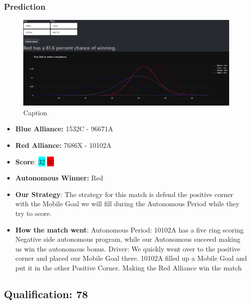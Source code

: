 \subsubsection*{Prediction}
\begin{figure}[H]
    \centering
    \includegraphics[width=0.8\linewidth]{images/Q68ND.png}
    \caption{Caption}
    \label{fig:enter-label}
\end{figure}
\begin{itemize}
    \item \textbf{Blue Alliance:} 1532C - 96671A
    \item \textbf{Red Alliance:} 7686X - 10102A
    \item \textbf{Score}: \colorbox{cyan}{32}
    \colorbox{red}{30}
    \item \textbf{Autonomous Winner:} Red
    \item \textbf{Our Strategy}: The strategy for this match is defend the positive corner with the Mobile Goal we will fill during the Autonomous Period while they try to score.
    \item \textbf{How the match went}: Autonomous Period: 10102A has a five ring scoring Negative side autonomous program, while our Autonomous succeed making us win the autonomous bonus. Driver: We quickly went over to the positive corner and placed our Mobile Goal there. 10102A filled up a Mobile Goal and put it in the other Positive Corner. Making the Red Alliance win the match
\end{itemize}

\subsection*{Qualification: 78}
